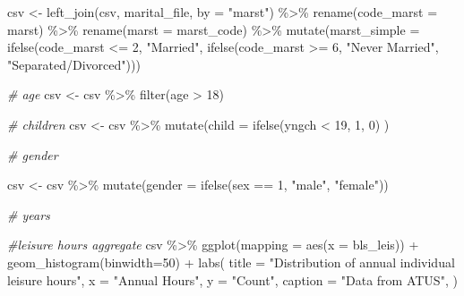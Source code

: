 \documentclass[
]{article}
\newenvironment{Shaded}{\begin{snugshade}}{\end{snugshade}}
\newcommand{\AttributeTok}[1]{\textcolor[rgb]{0.77,0.63,0.00}{#1}}
\newcommand{\CommentTok}[1]{\textcolor[rgb]{0.56,0.35,0.01}{\textit{#1}}}
\newcommand{\DecValTok}[1]{\textcolor[rgb]{0.00,0.00,0.81}{#1}}
\newcommand{\FunctionTok}[1]{\textcolor[rgb]{0.00,0.00,0.00}{#1}}
\newcommand{\NormalTok}[1]{#1}
\newcommand{\OtherTok}[1]{\textcolor[rgb]{0.56,0.35,0.01}{#1}}
\newcommand{\SpecialCharTok}[1]{\textcolor[rgb]{0.00,0.00,0.00}{#1}}
\newcommand{\StringTok}[1]{\textcolor[rgb]{0.31,0.60,0.02}{#1}}
\begin{document}
\begin{Shaded}
\begin{Highlighting}[]
\NormalTok{csv }\OtherTok{\textless{}{-}} \FunctionTok{left\_join}\NormalTok{(csv, marital\_file, }\AttributeTok{by =} \StringTok{"marst"}\NormalTok{) }\SpecialCharTok{\%\textgreater{}\%}
  \FunctionTok{rename}\NormalTok{(}\AttributeTok{code\_marst =}\NormalTok{ marst) }\SpecialCharTok{\%\textgreater{}\%}
  \FunctionTok{rename}\NormalTok{(}\AttributeTok{marst =}\NormalTok{ marst\_code) }\SpecialCharTok{\%\textgreater{}\%}
  \FunctionTok{mutate}\NormalTok{(}\AttributeTok{marst\_simple =} \FunctionTok{ifelse}\NormalTok{(code\_marst }\SpecialCharTok{\textless{}=} \DecValTok{2}\NormalTok{, }\StringTok{"Married"}\NormalTok{, }\FunctionTok{ifelse}\NormalTok{(code\_marst }\SpecialCharTok{\textgreater{}=} \DecValTok{6}\NormalTok{, }\StringTok{"Never Married"}\NormalTok{, }\StringTok{"Separated/Divorced"}\NormalTok{)))}



\CommentTok{\# age}
\NormalTok{csv }\OtherTok{\textless{}{-}}\NormalTok{ csv }\SpecialCharTok{\%\textgreater{}\%}
  \FunctionTok{filter}\NormalTok{(age }\SpecialCharTok{\textgreater{}} \DecValTok{18}\NormalTok{)}

\CommentTok{\# children}
\NormalTok{csv }\OtherTok{\textless{}{-}}\NormalTok{ csv }\SpecialCharTok{\%\textgreater{}\%}
  \FunctionTok{mutate}\NormalTok{(}\AttributeTok{child =} \FunctionTok{ifelse}\NormalTok{(yngch }\SpecialCharTok{\textless{}} \DecValTok{19}\NormalTok{, }\DecValTok{1}\NormalTok{, }\DecValTok{0}\NormalTok{) )}

\CommentTok{\# gender}

\NormalTok{csv }\OtherTok{\textless{}{-}}\NormalTok{ csv }\SpecialCharTok{\%\textgreater{}\%}
  \FunctionTok{mutate}\NormalTok{(}\AttributeTok{gender =} \FunctionTok{ifelse}\NormalTok{(sex }\SpecialCharTok{==} \DecValTok{1}\NormalTok{, }\StringTok{"male"}\NormalTok{, }\StringTok{"female"}\NormalTok{)) }

\CommentTok{\# years }
\end{Highlighting}
\end{Shaded}

\begin{Shaded}
\begin{Highlighting}[]
\CommentTok{\#leisure hours aggregate}
\NormalTok{csv }\SpecialCharTok{\%\textgreater{}\%}
  \FunctionTok{ggplot}\NormalTok{(}\AttributeTok{mapping =} \FunctionTok{aes}\NormalTok{(}\AttributeTok{x =}\NormalTok{ bls\_leis)) }\SpecialCharTok{+}
  \FunctionTok{geom\_histogram}\NormalTok{(}\AttributeTok{binwidth=}\DecValTok{50}\NormalTok{) }\SpecialCharTok{+}
  \FunctionTok{labs}\NormalTok{(}
  \AttributeTok{title =} \StringTok{"Distribution of annual individual leisure hours"}\NormalTok{,}
  \AttributeTok{x =} \StringTok{"Annual Hours"}\NormalTok{,}
  \AttributeTok{y =} \StringTok{"Count"}\NormalTok{,}
  \AttributeTok{caption =} \StringTok{"Data from ATUS"}\NormalTok{,}
\NormalTok{) }
\end{Highlighting}
\end{Shaded}
\end{document}
